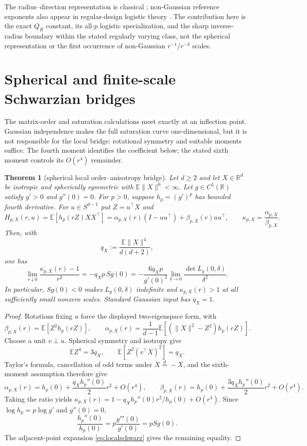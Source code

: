 \documentclass[11pt]{article}
\newtheorem{theorem}{Theorem}[section]
\newcommand{\E}{\mathbb E}
\newcommand{\R}{\mathbb R}
\begin{document}
The radius--direction representation is classical \cite{cambanis1981}; non-Gaussian reference exponents also
appear in regular-design logistic theory \cite{chardon2024}.  The contribution here is the exact $Q_R$ constant,
its all-$p$ logistic specialization, and the sharp inverse-radius boundary within the stated regularly varying
class, not the spherical representation or the
first occurrence of non-Gaussian $r^{-1}$/$r^{-3}$ scales.

\section{Spherical and finite-scale Schwarzian bridges}

The matrix-order and saturation calculations meet exactly at an inflection point.  Gaussian independence makes the
full saturation curve one-dimensional, but it is not responsible for the local bridge: rotational symmetry and
suitable moments suffice.  The fourth moment identifies the coefficient below; the stated sixth moment controls
its $O(r^4)$ remainder.

\begin{theorem}[spherical local order--anisotropy bridge]
\label{thm:bridge}
Let $d\ge2$ and let $X\in\R^d$ be isotropic and spherically symmetric with
$\E\lVert X\rVert^6<\infty$.  Let $g\in C^5(\R)$ satisfy $g'>0$ and $g''(0)=0$.
For $p>0$, suppose $h_p=(g')^p$ has bounded fourth derivative.  For $u\in S^{d-1}$ put
$Z=u^\top X$ and
\[
 H_{p,X}(r,u)=\E[h_p(rZ)XX^\top]
 =\alpha_{p,X}(r)(I-uu^\top)+\beta_{p,X}(r)uu^\top ,
 \qquad \kappa_{p,X}=\frac{\alpha_{p,X}}{\beta_{p,X}}.
\]
Then, with
\[
 q_X:=\frac{\E\lVert X\rVert^4}{d(d+2)},
\]
one has
\begin{equation}
 \lim_{r\downarrow0}\frac{\kappa_{p,X}(r)-1}{r^2}
 =-q_Xp\,Sg(0)
 =-\frac{6q_Xp}{g'(0)^2}
   \lim_{\delta\to0}\frac{\det L_g(0,\delta)}{\delta^2}.
 \label{eq:bridge}
\end{equation}
In particular, $Sg(0)<0$ makes $L_g(0,\delta)$ indefinite and
$\kappa_{p,X}(r)>1$ at all sufficiently small nonzero scales.  Standard Gaussian input has $q_X=1$.
\end{theorem}

\begin{proof}
Rotations fixing $u$ force the displayed two-eigenspace form, with
\[
 \beta_{p,X}(r)=\E[Z^2h_p(rZ)],\qquad
 \alpha_{p,X}(r)=\frac1{d-1}
 \E[(\lVert X\rVert^2-Z^2)h_p(rZ)].
\]
Choose a unit $v\perp u$.  Spherical symmetry and isotropy give
\[
 \E Z^4=3q_X,\qquad \E[Z^2(v^\top X)^2]=q_X.
\]
Taylor's formula, cancellation of odd terms under $X\stackrel d=-X$, and the sixth-moment assumption therefore give
\[
 \alpha_{p,X}(r)=h_p(0)+\frac{q_Xh_p''(0)}2r^2+O(r^4),\qquad
 \beta_{p,X}(r)=h_p(0)+\frac{3q_Xh_p''(0)}2r^2+O(r^4).
\]
Taking the ratio yields
$\kappa_{p,X}(r)=1-q_Xh_p''(0)r^2/h_p(0)+O(r^4)$.
Since $\log h_p=p\log g'$ and $g''(0)=0$,
\[
 \frac{h_p''(0)}{h_p(0)}=p\frac{g'''(0)}{g'(0)}=pSg(0).
\]
The adjacent-point expansion \eqref{eq:localschwarz} gives the remaining equality.
\end{proof}
\end{document}
